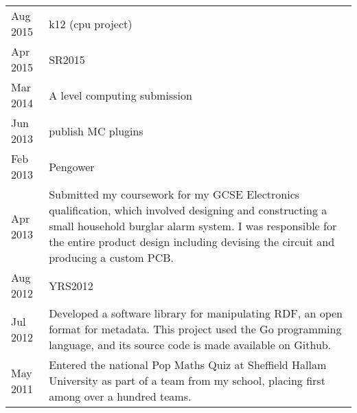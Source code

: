 

{
\setlength{\extrarowheight}{.7em}
\begin{tabu} to \textwidth {X[1,l] X[8,l]}
    Aug 2015 & k12 (cpu project) \\
    Apr 2015 & SR2015 \\
    Mar 2014 & A level computing submission \\
    Jun 2013 & publish MC plugins \\
    Feb 2013 & Pengower \\
    Apr 2013 & Submitted my coursework for my GCSE Electronics qualification, which involved designing and constructing a small household burglar alarm system. I was responsible for the entire product design including devising the circuit and producing a custom PCB. \\
    Aug 2012 & YRS2012 \\
    Jul 2012 & Developed a software library for manipulating RDF, an open format for metadata. This project used the Go programming language, and its source code is made available on Github. \\
    May 2011 & Entered the national Pop Maths Quiz at Sheffield Hallam University as part of a team from my school, placing first among over a hundred teams. \\
\end{tabu}
}
